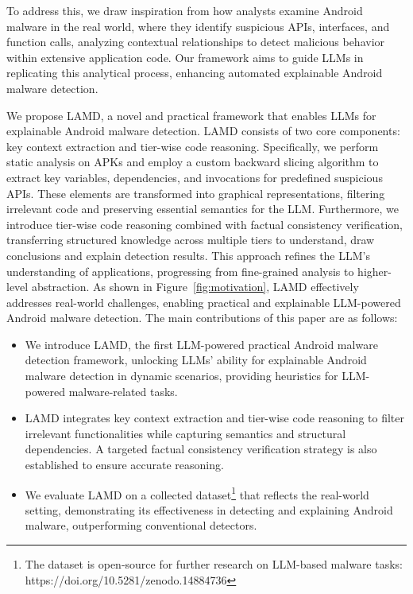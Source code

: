 To address this, we draw inspiration from how analysts examine Android malware in the real world, where they identify suspicious APIs, interfaces, and function calls, analyzing contextual relationships to detect malicious behavior within extensive application code. 
Our framework aims to guide LLMs in replicating this analytical process, enhancing automated explainable Android malware detection. 

We propose LAMD, a novel and practical framework that enables LLMs for explainable Android malware detection. LAMD consists of two core components: key context extraction and tier-wise code reasoning. Specifically, we perform static analysis on APKs and employ a custom backward slicing algorithm to extract key variables, dependencies, and invocations for predefined suspicious APIs. These elements are transformed into graphical representations, filtering irrelevant code and preserving essential semantics for the LLM. 
Furthermore, we introduce tier-wise code reasoning combined with factual consistency verification, transferring structured knowledge across multiple tiers to understand, draw conclusions and explain detection results. 
This approach refines the LLM’s understanding of applications, progressing from fine-grained analysis to higher-level abstraction. 
As shown in Figure~\ref{fig:motivation}, LAMD effectively addresses real-world challenges, enabling practical and explainable LLM-powered Android malware detection.
The main contributions of this paper are as follows:

\begin{itemize}
    \item We introduce LAMD, the first LLM-powered practical Android malware detection framework, unlocking LLMs' ability for explainable Android malware detection in dynamic scenarios, providing heuristics for LLM-powered malware-related tasks.
    \item LAMD integrates key context extraction and tier-wise code reasoning to filter irrelevant functionalities while capturing semantics and structural dependencies. A targeted factual consistency verification strategy is also established to ensure accurate reasoning. %
    \item We evaluate LAMD on a collected dataset\footnote{%
    The dataset is open-source for further research on LLM-based malware tasks: https://doi.org/10.5281/zenodo.14884736
    } 
    that reflects the real-world setting, demonstrating its effectiveness in detecting and explaining Android malware, outperforming conventional detectors.
\end{itemize}


